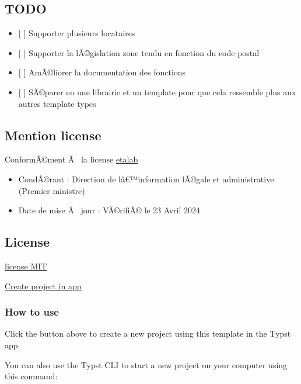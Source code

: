 \subsection{TODO}\label{todo}

\begin{itemize}
\tightlist
\item
  {[} {]} Supporter plusieurs locataires
\item
  {[} {]} Supporter la lÃ©gislation zone tendu en fonction du code
  postal
\item
  {[} {]} AmÃ©liorer la documentation des fonctions
\item
  {[} {]} SÃ©parer en une librairie et un template pour que cela
  ressemble plus aux autres template types
\end{itemize}

\subsection{Mention license}\label{mention-license}

ConformÃ©ment Ã~ la license
\href{https://github.com/etalab/licence-ouverte/blob/master/LO.md}{etalab}

\begin{itemize}
\tightlist
\item
  CondÃ©rant : Direction de lâ€™information lÃ©gale et administrative
  (Premier ministre)
\item
  Date de mise Ã~ jour : VÃ©rifiÃ© le 23 Avril 2024
\end{itemize}

\subsection{License}\label{license}

\href{https://github.com/typst/packages/raw/main/packages/preview/simple-preavis/0.1.0/LICENSE}{license
MIT}

\href{/app?template=simple-preavis&version=0.1.0}{Create project in app}

\subsubsection{How to use}\label{how-to-use}

Click the button above to create a new project using this template in
the Typst app.

You can also use the Typst CLI to start a new project on your computer
using this command:

